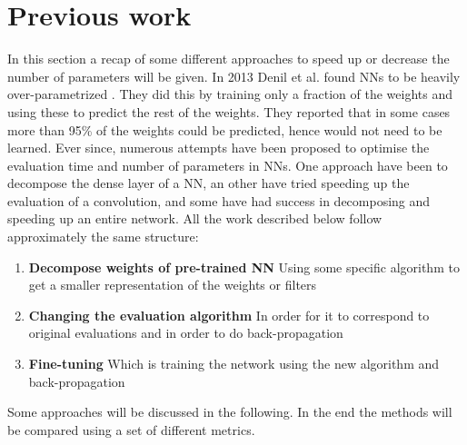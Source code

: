 \section{Previous work} \label{tex:previous_work}
In this section a recap of some different approaches to speed up or decrease the number of parameters will be given. In 2013 Denil et al. found NNs to be heavily over-parametrized \cite{Denil2013}. They did this by training only a fraction of the weights and using these to predict the rest of the weights. They reported that in some cases more than 95\% of the weights could be predicted, hence would not need to be learned. Ever since, numerous attempts have been proposed to optimise the evaluation time and number of parameters in NNs. One approach have been to decompose the dense layer of a NN, an other have tried speeding up the evaluation of a convolution, and some have had success in decomposing and speeding up an entire network. All the work described below follow approximately the same structure:

\begin{enumerate}
    \item \textbf{Decompose weights of pre-trained NN} Using some specific algorithm to get a smaller representation of the weights or filters
    \item \textbf{Changing the evaluation algorithm} In order for it to correspond to original evaluations and in order to do back-propagation
    \item \textbf{Fine-tuning} Which is training the network using the new algorithm and back-propagation 
\end{enumerate}
Some approaches will be discussed in the following. In the end the methods will be compared using a set of different metrics. 

